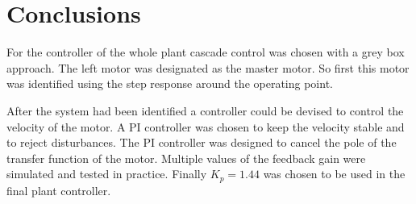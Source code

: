 \section{Conclusions}
For the controller of the whole plant cascade control was chosen with a grey box approach. The left motor was designated as the master motor. So first this motor was identified using the step response around the operating point. 

After the system had been identified a controller could be devised to control the velocity of the motor. A PI controller was chosen to keep the velocity stable and to reject disturbances. The PI controller was designed to cancel the pole of the transfer function of the motor. Multiple values of the feedback gain were simulated and tested in practice. Finally $K_p = 1.44$ was chosen to be used in the final plant controller.

